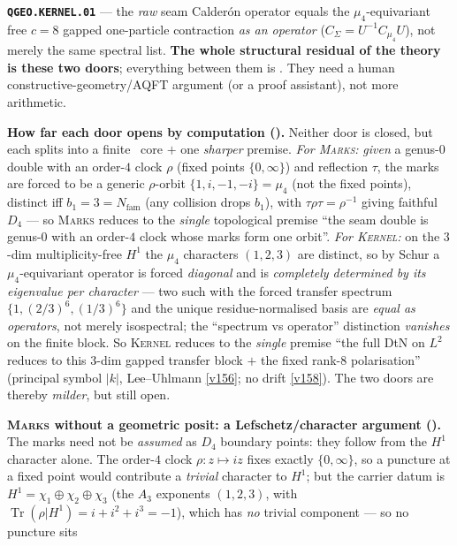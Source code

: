 \documentclass[11pt,a4paper]{article}
\newcommand{\Nfam}{N_{\mathrm{fam}}}
\begin{document}
\begin{keybox}
\textbf{\texttt{QGEO.KERNEL.01}} --- the \emph{raw} seam Calder\'on operator equals the
$\mu_4$-equivariant free $c{=}8$ gapped one-particle contraction \emph{as an operator}
($C_\Sigma=U^{-1}C_{\mu_4}U$), not merely the same spectral list. \textbf{The whole structural
residual of the theory is these two doors}; everything between them is \mE. They need a human
constructive-geometry/AQFT argument (or a proof assistant), not more arithmetic.
\par\smallskip\noindent\textbf{How far each door opens by computation ().}
Neither door is closed, but each splits into a finite \mE\ core $+$ one \emph{sharper} premise.
\emph{For \textsc{Marks}:} \emph{given} a genus-$0$ double with an order-$4$ clock $\rho$ (fixed points
$\{0,\infty\}$) and reflection $\tau$, the marks are forced to be a generic $\rho$-orbit
$\{1,i,-1,-i\}=\mu_4$ (not the fixed points), distinct iff $b_1=3=\Nfam$ (any collision drops $b_1$),
with $\tau\rho\tau=\rho^{-1}$ giving faithful $D_4$ --- so \textsc{Marks} reduces to the \emph{single}
topological premise ``the seam double is genus-$0$ with an order-$4$ clock whose marks form one
orbit''. \emph{For \textsc{Kernel}:} on the $3$-dim multiplicity-free $H^1$ the $\mu_4$ characters
$(1,2,3)$ are distinct, so by Schur a $\mu_4$-equivariant operator is forced \emph{diagonal} and is
\emph{completely determined by its eigenvalue per character} --- two such with the forced transfer
spectrum $\{1,(2/3)^6,(1/3)^6\}$ and the unique residue-normalised basis are \emph{equal as
operators}, not merely isospectral; the ``spectrum vs operator'' distinction \emph{vanishes} on the
finite block. So \textsc{Kernel} reduces to the \emph{single} premise ``the full DtN on $L^2$ reduces
to this $3$-dim gapped transfer block $+$ the fixed rank-$8$ polarisation'' (principal symbol $|k|$,
Lee--Uhlmann \vref{v156}; no drift \vref{v158}). The two doors are thereby \emph{milder}, but still open.
\par\smallskip\noindent\textbf{\textsc{Marks} without a geometric posit: a Lefschetz/character argument
().} The marks need not be \emph{assumed} as $D_4$ boundary
points: they follow from the $H^1$ character alone. The order-$4$ clock $\rho{:}z\mapsto iz$ fixes exactly
$\{0,\infty\}$, so a puncture at a fixed point would contribute a \emph{trivial} character to $H^1$; but the
carrier datum is $H^1=\chi_1\oplus\chi_2\oplus\chi_3$ (the $A_3$ exponents $(1,2,3)$, with
$\operatorname{Tr}(\rho|H^1)=i+i^2+i^3=-1$), which has \emph{no} trivial component --- so no puncture sits

\end{keybox}
\end{document}
